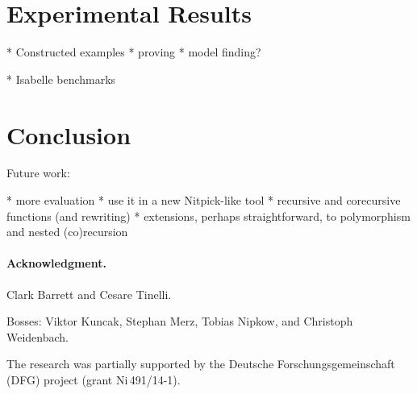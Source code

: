 \documentclass[a4paper,oribibl,envcountsame,draft]{llncs}
\begin{document}

\section{Experimental Results}
\label{sec:experimental-results}

  * Constructed examples
    * proving
    * model finding?

  * Isabelle benchmarks


\section{Conclusion}
\label{sec:conclusion}

Future work:

  * more evaluation
    * use it in a new Nitpick-like tool
  * recursive and corecursive functions
    (and rewriting)
  * extensions, perhaps straightforward, to polymorphism and nested
    (co)recursion

\def\ackname{Acknowledgment}
\paragraph{\ackname.}

Clark Barrett and Cesare Tinelli.

Bosses: Viktor Kuncak, Stephan Merz, Tobias Nipkow, and Christoph Weidenbach.

The research was partially supported by the Deutsche
Forschungs\-gemein\-schaft (DFG) project
 (grant Ni\,491\slash 14-1).


{}
\end{document}
